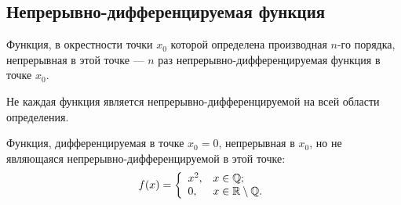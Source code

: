 \subsection{Непрерывно-дифференцируемая функция}
\begin{definition} 
Функция, в окрестности точки \( x_0 \) которой определена производная \( n \)-го порядка, непрерывная в этой точке --- \( n \) раз непрерывно-дифференцируемая функция в точке \( x_0 \).
\end{definition}
Не каждая функция является непрерывно-дифференцируемой на всей области определения.
\begin{example} Функция, дифференцируемая в точке \( x_0 = 0 \), непрерывная в \( x_0 \), но не являющаяся непрерывно-дифференцируемой в этой точке: 
\[ 
    f(x) = \left\{ \begin{array}{ll}
        x^2, & x \in \mathbb{Q}; \\
        0,   & x \in \mathbb{R} \setminus \mathbb{Q}.
    \end{array} \right.
\]
\end{example} %
